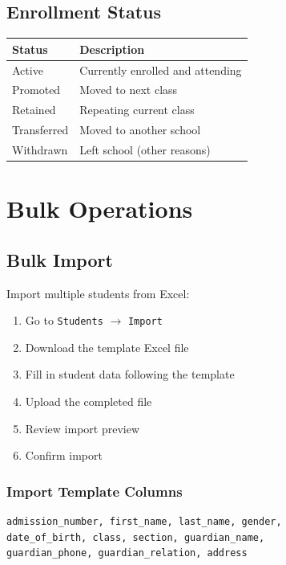 \documentclass[12pt,a4paper]{report}
\begin{document}
\section{Enrollment Status}

\begin{longtable}{@{}p{3cm}p{10cm}@{}}
\toprule
\textbf{Status} & \textbf{Description} \\
\midrule
\endhead
Active & Currently enrolled and attending \\
Promoted & Moved to next class \\
Retained & Repeating current class \\
Transferred & Moved to another school \\
Withdrawn & Left school (other reasons) \\
\bottomrule
\end{longtable}

\chapter{Bulk Operations}

\section{Bulk Import}

Import multiple students from Excel:

\begin{enumerate}[leftmargin=*]
    \item Go to \texttt{Students} $\rightarrow$ \texttt{Import}
    \item Download the template Excel file
    \item Fill in student data following the template
    \item Upload the completed file
    \item Review import preview
    \item Confirm import
\end{enumerate}

\subsection{Import Template Columns}

\begin{lstlisting}[basicstyle=\ttfamily\footnotesize]
admission_number, first_name, last_name, gender, 
date_of_birth, class, section, guardian_name, 
guardian_phone, guardian_relation, address
\end{lstlisting}
\end{document}
